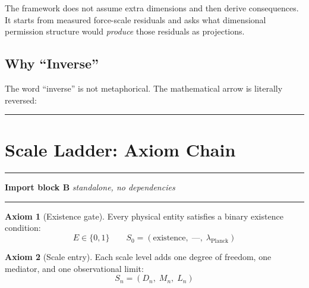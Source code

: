 \documentclass[11pt, a4paper, oneside]{article}
\theoremstyle{definition}
\newtheorem{axiom}{Axiom}[section]
\theoremstyle{plain}
\theoremstyle{remark}
\begin{document}
The framework does not assume extra dimensions and then derive consequences.
It starts from measured force-scale residuals and asks what dimensional
permission structure would \emph{produce} those residuals as projections.

\subsection*{Why ``Inverse''}

The word ``inverse'' is not metaphorical. The mathematical arrow is
literally reversed:
\begin{center}
\end{center}

\noindent\rule{\linewidth}{0.4pt}

\section{Scale Ladder: Axiom Chain}
\label{sec:axioms}

\noindent\rule{\linewidth}{0.8pt}
\textbf{Import block B} \hfill \textit{standalone, no dependencies}
\noindent\rule{\linewidth}{0.4pt}

\begin{axiom}[Existence gate]
  Every physical entity satisfies a binary existence condition:
  \begin{equation}
	E \in \{0, 1\}
	\qquad S_0 = (\text{existence},\; \text{---},\; \lambda_\text{Planck})
	\tag{B.1}
  \end{equation}
\end{axiom}

\begin{axiom}[Scale entry]
  Each scale level adds one degree of freedom, one mediator, and one
  observational limit:
  \begin{equation}
	S_n = (D_n,\; M_n,\; L_n)
	\tag{B.2}
  \end{equation}
\end{axiom}
\end{document}
